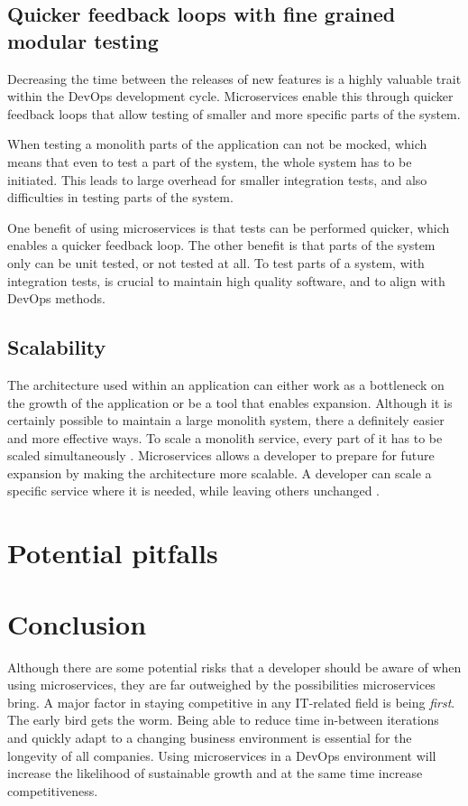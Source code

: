 \documentclass{article}
\begin{document}
\subsection{Quicker feedback loops with fine grained modular testing}
Decreasing the time between the releases of new features is a highly valuable trait within the DevOps development cycle. Microservices enable this through quicker feedback loops that allow testing of smaller and more specific parts of the system.

When testing a monolith parts of the application can not be mocked, which means that even to test a part of the system, the whole system has to be initiated. This leads to large overhead for smaller integration tests, and also difficulties in testing parts of the system.

One benefit of using microservices is that tests can be performed quicker, which enables a quicker feedback loop. The other benefit is that parts of the system only can be unit tested, or not tested at all. To test parts of a system, with integration tests, is crucial to maintain high quality software, and to align with DevOps methods.

\subsection{Scalability}
The architecture used within an application can either work as a bottleneck on the growth of the application or be a tool that enables expansion. Although it is certainly possible to maintain a large monolith system, there a definitely easier and more effective ways. To scale a monolith service, every part of it has to be scaled simultaneously \cite{Newman2015}. Microservices allows a developer to prepare for future expansion by making the architecture more scalable. A developer can scale a specific service where it is needed, while leaving others unchanged \cite{Newman2015}.


\section{Potential pitfalls}


\section{Conclusion}
Although there are some potential risks that a developer should be aware of when using microservices, they are far outweighed by the possibilities microservices bring. A major factor in staying competitive in any IT-related field is being \textit{first}. The early bird gets the worm. Being able to reduce time in-between iterations and quickly adapt to a changing business environment is essential for the longevity of all companies. Using microservices in a DevOps environment will increase the likelihood of sustainable growth and at the same time increase competitiveness.


\newpage
\printbibliography
\end{document}
